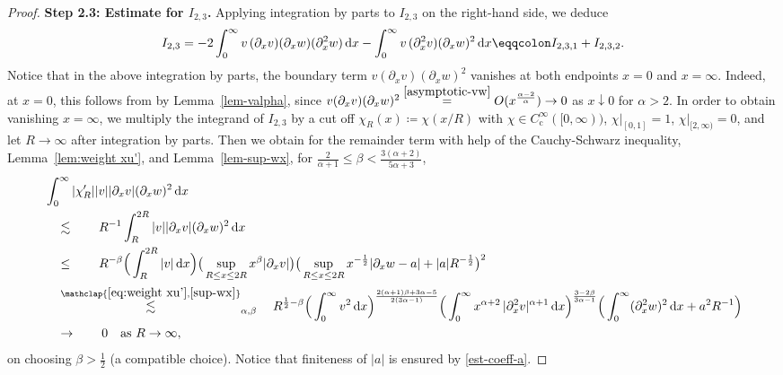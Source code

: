 \documentclass[reqno,12pt]{amsart}
\renewcommand{\d}{\ensuremath{\mathrm{d}}}
\renewcommand{\d}{\ensuremath{{\rm d}}}
\numberwithin{equation}{section}
\begin{document}
\begin{proof}
\noindent\textbf{Step 2.3: Estimate for $I_{2,3}$. }
Applying integration by parts to $I_{2,3}$ on the right-hand side, we deduce
%
\begin{equation} \label{eq:est-ux2-wx21}
    I_{2,3}
    = 
    -2  \int_0^\infty v \, ( \partial_x v) (\partial_x w) (\partial_x^2 w) \, \d x 
    -  
    \int_0^\infty v \, ( \partial_x^2 v) (\partial_x w)^2 \, \d x \eqqcolon 
    I_{2,3,1} + I_{2,3,2}. 
\end{equation}
%
Notice that in the above integration by parts, the boundary term 
$v(\partial_x v)(\partial_x w)^2$ vanishes at both endpoints $x = 0$ and $x = \infty$. Indeed, at $x = 0$, this follows from by Lemma~\ref{lem-valpha}, since $v(\partial_x v)(\partial_x w)^2
\stackrel{\eqref{asymptotic-vw}}{=}O(x^{\frac{\alpha-2}{\alpha}}) \to 0$ as $x \downarrow 0$ for $\alpha > 2$. In order to obtain vanishing $x = \infty$, we multiply the integrand of $I_{2,3}$ by a cut off $\chi_R(x)  \coloneq \chi(x/R)$ with
$\chi \in C^\infty_\mathrm{c}([0,\infty))$,
$\chi|_{[0,1]} = 1$, $\chi|_{[2,\infty)} = 0$, and let $R \to \infty$ after integration by parts. Then we obtain for the remainder term with help of the Cauchy-Schwarz inequality, Lemma~\ref{lem:weight xu'}, and Lemma~\ref{lem-sup-wx}, for $\frac{2}{\alpha+1} \le \beta < \frac{3(\alpha+2)}{5\alpha+3}$,
%
\begin{align*}
& \int_0^\infty |\chi_R'| |v| |\partial_x v| (\partial_x w)^2 \, \d x \\
& \quad \lesssim \qquad R^{-1} \int_R^{2R} |v| |\partial_x v| (\partial_x w)^2 \, \d x \\
& \quad \le \qquad R^{-\beta} \Big(\int_R^{2R} |v| \, \d x\Big) \big(\sup_{R \le x \le 2R} x^\beta |\partial_x v|\big) \big(\sup_{R \le x \le 2R} x^{-\frac 1 2} |\partial_x w -a| + |a| R^{-\frac 1 2}\big)^2 \\
& \quad \stackrel{\mathclap{\eqref{eq:weight xu'}, \eqref{sup-wx}}}{\lesssim}_{\alpha,\beta} \quad R^{\frac 1 2-\beta} \Big(\int_0^\infty v^2 \, \d x\Big)^{\frac{2(\alpha +1)\beta + 3\alpha-5}{2(3\alpha -1)}} \Big(\int_0^\infty x^{\alpha+2} \, |\partial_x^2 v|^{\alpha+1} \, \d x\Big)^{\frac{3-2\beta}{3\alpha -1}} \Big(\int_0^\infty (\partial_x^2 w)^2 \, \d x + a^2 R^{-1}\Big) \\
& \quad \to \qquad 0 \quad \text{as } R \to \infty,
\end{align*}
%
on choosing $\beta > \frac 1 2$ (a compatible choice). Notice that finiteness of $|a|$ is ensured by \eqref{est-coeff-a}.

%
\bigskip
%


\end{proof}
\end{document}
